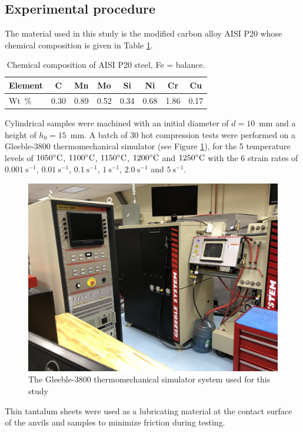 \documentclass[twoside,english,1p,final,sort&compress]{elsarticle}
\theoremstyle{plain}
\DeclareRobustCommand{\ps}{\text{s}^{-1}}
\begin{document}
\subsection{Experimental procedure}

The material used in this study is the modified carbon alloy AISI P20 whose chemical composition is given in Table \ref{tab:Composition}.
\begin{table}[h!]
\centering
\caption{Chemical composition of AISI P20 steel, Fe = balance.}
\begin{tabular}{lccccccc}
	\hline
	Element &  C   &  Mn  &  Mo  &  Si  &  Ni  &  Cr  &  Cu  \\ \hline
	Wt~\%   & 0.30 & 0.89 & 0.52 & 0.34 & 0.68 & 1.86 & 0.17 \\ \hline
\end{tabular}
\label{tab:Composition}
\end{table}
Cylindrical samples were machined with an initial diameter of $d=10$~mm and a height of $h_0=15$~mm.
A batch of 30 hot compression tests were performed on a Gleeble-3800 thermomechanical simulator (see Figure \ref{fig:Gleeble3800}), for the 5 temperature levels of $1050\celsius$, $1100\celsius$, $1150\celsius$, $1200\celsius$ and $1250\celsius$ with the 6 strain rates of $0.001~\ps$, $0.01~\ps$, $0.1~\ps$, $1~\ps$, $2.0~\ps$ and $5~\ps$.
\begin{figure}[!ht]
\centering
\includegraphics[width=0.7\columnwidth]{Figures/Gleeble-3800}
\caption{The Gleeble-3800 thermomechanical simulator system used for this study}
\label{fig:Gleeble3800}
\end{figure}
Thin tantalum sheets were used as a lubricating material at the contact surface of the anvils and samples to minimize friction during testing.
\end{document}
